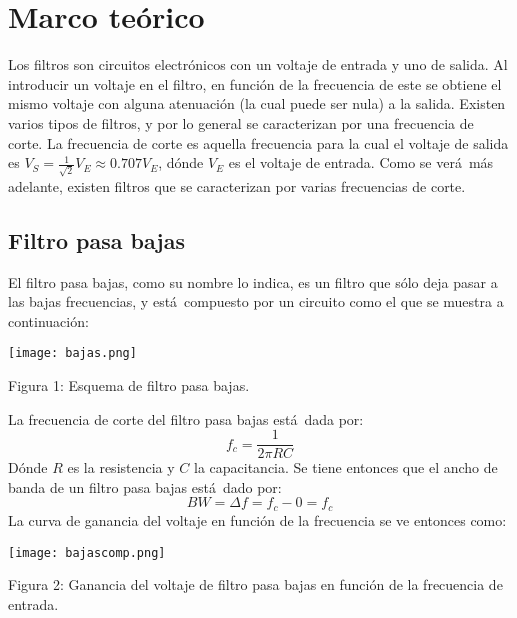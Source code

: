 \documentclass[11pt]{article}
\renewcommand{\=}[1]{\stackrel{#1}{=}} %
\theoremstyle{definition}
\theoremstyle{remark}
\begin{document}
\section{Marco te\'orico}
Los filtros son circuitos electr\'onicos con un voltaje de entrada y uno de salida. Al introducir un voltaje en el filtro, en funci\'on de la frecuencia de este se obtiene el mismo voltaje con alguna atenuaci\'on (la cual puede ser nula) a la salida. Existen varios tipos de filtros, y por lo general se caracterizan por una frecuencia de corte. La frecuencia de corte es aquella frecuencia para la cual el voltaje de salida es $V_S=\frac{1}{\sqrt{2}}V_E\approx 0.707V_E$, d\'onde $V_E$ es el voltaje de entrada. Como se ver\'a\ m\'as adelante, existen filtros que se caracterizan por varias frecuencias de corte.
\subsection*{Filtro pasa bajas}
El filtro pasa bajas, como su nombre lo indica, es un filtro que s\'olo deja pasar a las bajas frecuencias, y est\'a\ compuesto por un circuito como el que se muestra a continuaci\'on:
\begin{center}
\texttt{[image: bajas.png]}
\end{center}
\begin{center}
Figura 1: Esquema de filtro pasa bajas.
\end{center}
La frecuencia de corte del filtro pasa bajas est\'a\ dada por:
\begin{equation}
f_c=\frac{1}{2\pi RC}
\end{equation}
D\'onde $R$ es la resistencia y $C$ la capacitancia. Se tiene entonces que el ancho de banda de un filtro pasa bajas est\'a\ dado por:
\begin{equation}
BW=\Delta f=f_c-0=f_c
\end{equation}
La curva de ganancia del voltaje en funci\'on de la frecuencia se ve entonces como:
\begin{center}
\texttt{[image: bajascomp.png]}
\end{center}
\begin{center}
Figura 2: Ganancia del voltaje de filtro pasa bajas en funci\'on de la frecuencia de entrada.
\end{center}
\end{document}
